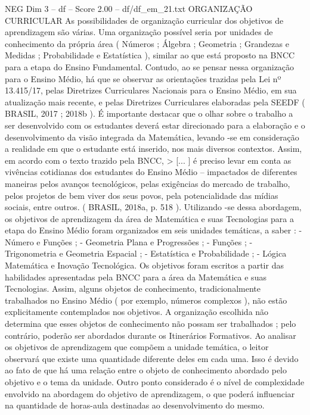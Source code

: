 \begin{textsample}{NEG Dim 3 – df – Score 2.00 – df/df\_em\_21.txt}  \label{ex:f3_neg_170}
ORGANIZAÇÃO CURRICULAR As possibilidades de organização curricular dos objetivos de aprendizagem são várias.
Uma organização possível seria por unidades de conhecimento da própria área ( Números ; Álgebra ; Geometria ; Grandezas e Medidas ; Probabilidade e Estatística ), similar ao que está proposto na BNCC para a etapa do Ensino Fundamental.
Contudo, ao se pensar nessa organização para o Ensino Médio, há que se observar as orientações trazidas pela Lei nº 13.415/17, pelas Diretrizes Curriculares Nacionais para o Ensino Médio, em sua atualização mais recente, e pelas Diretrizes Curriculares elaboradas pela SEEDF ( BRASIL, 2017 ; 2018b ).
É importante destacar que o olhar sobre o trabalho a ser desenvolvido com os estudantes deverá estar direcionado para a elaboração e o desenvolvimento da visão integrada da Matemática, levando -se em consideração a realidade em que o estudante está inserido, nos mais diversos contextos.
Assim, em acordo com o texto trazido pela BNCC, > [... ] é preciso levar em conta as vivências cotidianas dos estudantes do Ensino Médio – impactados de diferentes maneiras pelos avanços tecnológicos, pelas exigências do mercado de trabalho, pelos projetos de bem viver dos seus povos, pela potencialidade das mídias sociais, entre outros. ( BRASIL, 2018a, p. 518 ).
Utilizando -se dessa abordagem, os objetivos de aprendizagem da área de Matemática e suas Tecnologias para a etapa do Ensino Médio foram organizados em seis unidades temáticas, a saber : - Número e Funções ; - Geometria Plana e Progressões ; - Funções ; - Trigonometria e Geometria Espacial ; - Estatística e Probabilidade ; - Lógica Matemática e Inovação Tecnológica.
Os objetivos foram escritos a partir das habilidades apresentadas pela BNCC para a área da Matemática e suas Tecnologias.
Assim, alguns objetos de conhecimento, tradicionalmente trabalhados no Ensino Médio ( por exemplo, números complexos ), não estão explicitamente contemplados nos objetivos.
A organização escolhida não determina que esses objetos de conhecimento não possam ser trabalhados ; pelo contrário, poderão ser abordados durante os Itinerários Formativos.
Ao analisar os objetivos de aprendizagem que compõem a unidade temática, o leitor observará que existe uma quantidade diferente deles em cada uma.
Isso é devido ao fato de que há uma relação entre o objeto de conhecimento abordado pelo objetivo e o tema da unidade.
Outro ponto considerado é o nível de complexidade envolvido na abordagem do objetivo de aprendizagem, o que poderá influenciar na quantidade de horas-aula destinadas ao desenvolvimento do mesmo.

\end{textsample}
